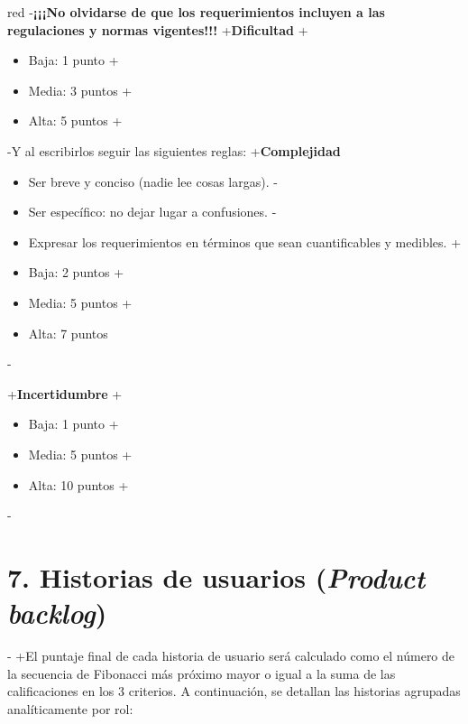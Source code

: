 \documentclass[
 11pt, %
-%
+codirector, %
 ]{charter}
\begin{document}
\begin{table}[ht]
\begin{table}[ht]
\begin{consigna}{red}
-\textbf{¡¡¡No olvidarse de que los requerimientos incluyen a las regulaciones y normas vigentes!!!}
+\textbf{Dificultad}
+\begin{itemize}
+    \item Baja: 1 punto
+    \item Media: 3 puntos
+    \item Alta: 5 puntos
+\end{itemize}
 
-Y al escribirlos seguir las siguientes reglas:
+\textbf{Complejidad}
 \begin{itemize}
-	\item Ser breve y conciso (nadie lee cosas largas). 
-	\item Ser específico: no dejar lugar a confusiones.
-	\item Expresar los requerimientos en términos que sean cuantificables y medibles.
+    \item Baja: 2 puntos
+    \item Media: 5 puntos
+    \item Alta: 7 puntos
 \end{itemize}
 
-\end{consigna} %
+\textbf{Incertidumbre}
+\begin{itemize}
+    \item Baja: 1 punto
+    \item Media: 5 puntos
+    \item Alta: 10 puntos
+\end{itemize}
 
-\section{7. Historias de usuarios (\textit{Product backlog})}
-\label{sec:backlog}
+El puntaje final de cada historia de usuario será calculado como el número de la secuencia de Fibonacci más próximo mayor o igual a la suma de las calificaciones en los 3 criterios. A continuación, se detallan las historias agrupadas analíticamente por rol:
 

\end{table}
\end{table}
\end{document}
